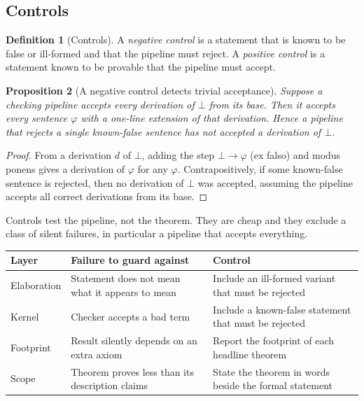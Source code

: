 \documentclass[11pt]{article}
\theoremstyle{definition}
\newtheorem{definition}{Definition}[section]
\theoremstyle{plain}
\newtheorem{proposition}[definition]{Proposition}
\theoremstyle{remark}
\begin{document}
\subsection{Controls}

\begin{definition}[Controls]\label{def:controls}
A \emph{negative control} is a statement that is known to be false or ill-formed and that the pipeline must reject. A \emph{positive control} is a statement known to be provable that the pipeline must accept.
\end{definition}

\begin{proposition}[A negative control detects trivial acceptance]\label{prop:control}
Suppose a checking pipeline accepts every derivation of $\bot$ from its base. Then it accepts every sentence $\varphi$ with a one-line extension of that derivation. Hence a pipeline that rejects a single known-false sentence has not accepted a derivation of $\bot$.
\end{proposition}
\begin{proof}
From a derivation $d$ of $\bot$, adding the step $\bot\to\varphi$ (ex falso) and modus ponens gives a derivation of $\varphi$ for any $\varphi$. Contrapositively, if some known-false sentence is rejected, then no derivation of $\bot$ was accepted, assuming the pipeline accepts all correct derivations from its base.
\end{proof}

Controls test the pipeline, not the theorem. They are cheap and they exclude a class of silent failures, in particular a pipeline that accepts everything.

\begin{center}
\small
\begin{tabular}{@{}p{}p{}p{}@{}}
\toprule
Layer & Failure to guard against & Control\\
\midrule
Elaboration & Statement does not mean what it appears to mean & Include an ill-formed variant that must be rejected\\
Kernel & Checker accepts a bad term & Include a known-false statement that must be rejected\\
Footprint & Result silently depends on an extra axiom & Report the footprint of each headline theorem\\
Scope & Theorem proves less than its description claims & State the theorem in words beside the formal statement\\
\bottomrule
\end{tabular}
\end{center}
\end{document}
